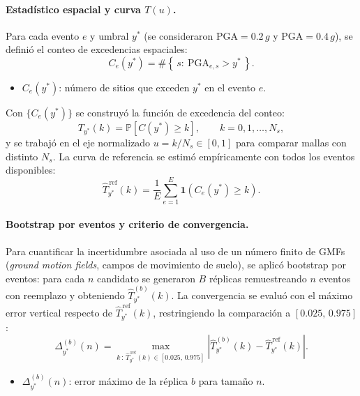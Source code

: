 \paragraph{Estadístico espacial y curva $T(u)$.}
Para cada evento $e$ y umbral $y^\ast$ (se consideraron $\mathrm{PGA}=0.2\,g$ y $\mathrm{PGA}=0.4\,g$), se definió el conteo de excedencias espaciales:
\begin{equation}
C_e(y^\ast)=\#\left\{\,s:\ \mathrm{PGA}_{e,s}>y^\ast\,\right\}.
\label{eq:Ce_def}
\end{equation}
\begin{itemize}
  \item $C_e(y^\ast)$: número de sitios que exceden $y^\ast$ en el evento $e$.
\end{itemize}

Con $\{C_e(y^\ast)\}$ se construyó la función de excedencia del conteo:
\begin{equation}
T_{y^\ast}(k)=\mathbb{P}\!\left[C(y^\ast)\ge k\right],
\qquad k=0,1,\dots,N_s,
\label{eq:Tu_k}
\end{equation}
y se trabajó en el eje normalizado $u=k/N_s\in[0,1]$ para comparar mallas con distinto $N_s$. La curva de referencia se estimó empíricamente con todos los eventos disponibles:
\begin{equation}
\widehat{T}^{\,\mathrm{ref}}_{y^\ast}(k)=\frac{1}{E}\sum_{e=1}^{E}\mathbf{1}\!\left(C_e(y^\ast)\ge k\right).
\label{eq:Tu_ref}
\end{equation}

\paragraph{Bootstrap por eventos y criterio de convergencia.}
Para cuantificar la incertidumbre asociada al uso de un número finito de GMFs (\textit{ground motion fields}, campos de movimiento de suelo), se aplicó bootstrap por eventos: para cada $n$ candidato se generaron $B$ réplicas remuestreando $n$ eventos con reemplazo y obteniendo $\widehat{T}^{(b)}_{y^\ast}(k)$. La convergencia se evaluó con el máximo error vertical respecto de $\widehat{T}^{\,\mathrm{ref}}_{y^\ast}(k)$, restringiendo la comparación a $[0.025,\,0.975]$:
\begin{equation}
\Delta^{(b)}_{y^\ast}(n)=
\max_{k\,:\,\widehat{T}^{\,\mathrm{ref}}_{y^\ast}(k)\in[0.025,\,0.975]}
\left|\widehat{T}^{(b)}_{y^\ast}(k)-\widehat{T}^{\,\mathrm{ref}}_{y^\ast}(k)\right|.
\label{eq:delta_sup}
\end{equation}
\begin{itemize}
  \item $\Delta^{(b)}_{y^\ast}(n)$: error máximo de la réplica $b$ para tamaño $n$.
\end{itemize}


